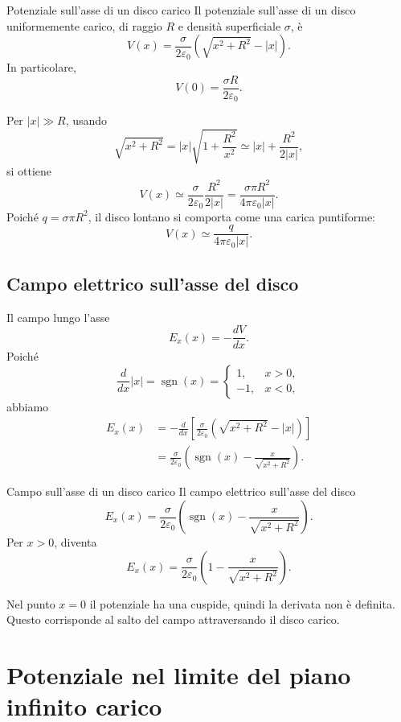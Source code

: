 \documentclass[a4paper]{article}
\begin{document}
\begin{snippettheorem}{Potenziale sull'asse di un disco carico}
    Il potenziale sull'asse di un disco uniformemente carico, di raggio \(R\) e densità superficiale \(\sigma\), è
    \[
        V(x)=\frac{\sigma}{2\varepsilon_0}\left(\sqrt{x^2+R^2}-|x|\right).
    \]
    In particolare,
    \[
        V(0)=\frac{\sigma R}{2\varepsilon_0}.
    \]
\end{snippettheorem}

Per \(|x|\gg R\), usando
\[
    \sqrt{x^2+R^2}=|x|\sqrt{1+\frac{R^2}{x^2}}
    \simeq |x|+\frac{R^2}{2|x|},
\]
si ottiene
\[
    V(x)\simeq \frac{\sigma}{2\varepsilon_0}\frac{R^2}{2|x|}
    =\frac{\sigma\pi R^2}{4\pi\varepsilon_0|x|}.
\]
Poiché \(q=\sigma\pi R^2\), il disco lontano si comporta come una carica puntiforme:
\[
    V(x)\simeq \frac{q}{4\pi\varepsilon_0|x|}.
\]

\subsection{Campo elettrico sull'asse del disco}

Il campo lungo l'asse
\[
    E_x(x)=-\frac{dV}{dx}.
\]
Poiché
\[
    \frac{d}{dx}|x|=\operatorname{sgn}(x)
    =
    \begin{cases}
        1, & x>0,\\
        -1, & x<0,
    \end{cases}
\]
abbiamo
\begin{align*}
    E_x(x)
    &=-\frac{d}{dx}\left[\frac{\sigma}{2\varepsilon_0}\left(\sqrt{x^2+R^2}-|x|\right)\right] \\
    &=\frac{\sigma}{2\varepsilon_0}\left(\operatorname{sgn}(x)-\frac{x}{\sqrt{x^2+R^2}}\right).
\end{align*}

\begin{snippetproposition}{Campo sull'asse di un disco carico}
    Il campo elettrico sull'asse del disco
    \[
        E_x(x)=\frac{\sigma}{2\varepsilon_0}\left(\operatorname{sgn}(x)-\frac{x}{\sqrt{x^2+R^2}}\right).
    \]
    Per \(x>0\), diventa
    \[
        E_x(x)=\frac{\sigma}{2\varepsilon_0}\left(1-\frac{x}{\sqrt{x^2+R^2}}\right).
    \]
\end{snippetproposition}

Nel punto \(x=0\) il potenziale ha una cuspide, quindi la derivata non è definita. Questo corrisponde al salto del campo attraversando il disco carico.

\section{Potenziale nel limite del piano infinito carico}
\end{document}
